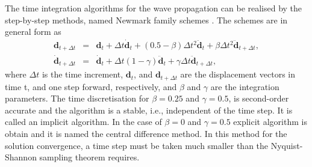 \documentclass[11pt,a4paper,final]{report}
\theoremstyle{plain}
\begin{document}
The time integration algorithms for the wave propagation can be realised by the step-by-step methods, named Newmark family schemes \cite{newmark1959method}.
The schemes are in general form as
\begin{eqnarray}
	\label{eq:u_newmark}
	\textbf{d}_{t+\Delta t} & = & \textbf{d}_{t} +\Delta t \dot{\textbf{d}}_{t} + \left( 0.5 - \beta \right)\Delta t^2\ddot{\textbf{d}}_{t} + \beta \Delta t^2\ddot{\textbf{d}}_{t+\Delta t},\\
	\dot{\textbf{d}}_{t+\Delta t} & = & \dot{\textbf{d}}_{t} + \Delta t\left(1-\gamma\right)\ddot{\textbf{d}}_{t} + \gamma \Delta t\ddot{\textbf{d}}_{t+\Delta t},
\end{eqnarray}
where \(\Delta t\) is the time increment, \(\textbf{d}_{t}\), and \(\textbf{d}_{t+\Delta t}\) are the displacement vectors in time t, and one step forward, respectively, and \(\beta\) and \(\gamma\) are the integration parameters.
The time discretisation for \(\beta = 0.25\) and \(\gamma = 0.5\), is second-order accurate and the algorithm is a stable, i.e., independent of the time step. It is called an implicit algorithm.
In the case of \(\beta = 0\) and \(\gamma = 0.5\) explicit algorithm is obtain and it is named the central difference method.
In this method for the solution convergence, a time step must be taken much smaller than the Nyquist-Shannon sampling theorem requires.
\end{document}
